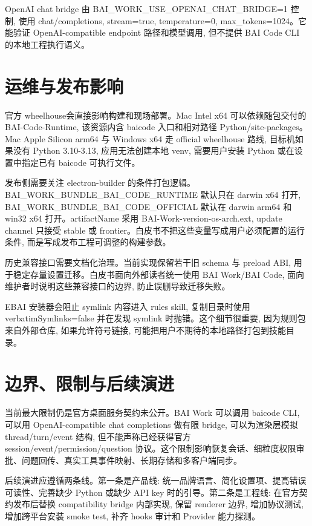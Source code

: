 OpenAI chat bridge 由 BAI\_WORK\_USE\_OPENAI\_CHAT\_BRIDGE=1 控制, 使用 chat/completions, stream=true, temperature=0, max\_tokens=1024。它能验证 OpenAI-compatible endpoint 路径和模型调用, 但不提供 BAI Code CLI 的本地工程执行语义。

\section{运维与发布影响}
官方 wheelhouse会直接影响构建和现场部署。Mac Intel x64 可以依赖随包交付的 BAI-Code-Runtime, 该资源内含 baicode 入口和相对路径 Python/site-packages。Mac Apple Silicon arm64 与 Windows x64 走 official wheelhouse 路线, 目标机如果没有 Python 3.10-3.13, 应用无法创建本地 venv, 需要用户安装 Python 或在设置中指定已有 baicode 可执行文件。

发布侧需要关注 electron-builder 的条件打包逻辑。BAI\_WORK\_BUNDLE\_BAI\_CODE\_RUNTIME 默认只在 darwin x64 打开, BAI\_WORK\_BUNDLE\_BAI\_CODE\_OFFICIAL 默认在 darwin arm64 和 win32 x64 打开。artifactName 采用 BAI-Work-{version}-{os}-{arch}.{ext}, update channel 只接受 stable 或 frontier。白皮书不把这些变量写成用户必须配置的运行条件, 而是写成发布工程可调整的构建参数。

历史兼容接口需要文档化治理。当前实现保留若干旧 schema 与 preload ABI, 用于稳定存量设置迁移。白皮书面向外部读者统一使用 BAI Work/BAI Code, 面向维护者时说明这些兼容接口的边界, 防止误删导致迁移失败。

EBAI 安装器会阻止 symlink 内容进入 rules skill, 复制目录时使用 verbatimSymlinks=false 并在发现 symlink 时抛错。这个细节很重要, 因为规则包来自外部仓库, 如果允许符号链接, 可能把用户不期待的本地路径打包到技能目录。

\section{边界、限制与后续演进}
当前最大限制仍是官方桌面服务契约未公开。BAI Work 可以调用 baicode CLI, 可以用 OpenAI-compatible chat completions 做有限 bridge, 可以为渲染层模拟 thread/turn/event 结构, 但不能声称已经获得官方 session/event/permission/question 协议。这个限制影响恢复会话、细粒度权限审批、问题回传、真实工具事件映射、长期存储和多客户端同步。

后续演进应遵循两条线。第一条是产品线: 统一品牌语言、简化设置项、提高错误可读性、完善缺少 Python 或缺少 API key 时的引导。第二条是工程线: 在官方契约发布后替换 compatibility bridge 内部实现, 保留 renderer 边界, 增加协议测试, 增加跨平台安装 smoke test, 补齐 hooks 审计和 Provider 能力探测。

